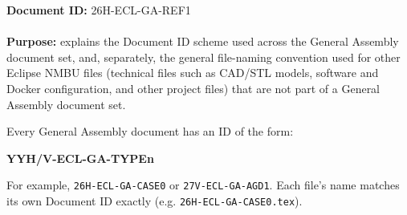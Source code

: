 \documentclass{../../../Common/Latex/Templates/rapport}
\date{\meetingdate, \meetingtime}
\begin{document}
\makecoverpage
\tableofcontents
\reportmainmatter

\noindent\textbf{Document ID:} 26H-ECL-GA-REF1\\
\meetingline\\
\textbf{Purpose:} explains the Document ID scheme used across the General Assembly document set, and, separately, the general file-naming convention used for other Eclipse NMBU files (technical files such as CAD/STL models, software and Docker configuration, and other project files) that are not part of a General Assembly document set.


Every General Assembly document has an ID of the form:
\begin{center}
  \bfseries YYH/V-ECL-GA-TYPEn
\end{center}
For example, \texttt{26H-ECL-GA-CASE0} or \texttt{27V-ECL-GA-AGD1}. Each file's name matches its own Document ID exactly (e.g. \texttt{26H-ECL-GA-CASE0.tex}).
\end{document}
